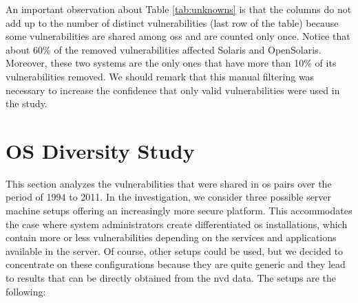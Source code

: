 An important observation about Table \ref{tab:unknowns} is that the columns do not add up to the number of distinct vulnerabilities (last row of the table) because some vulnerabilities are shared among \glspl{os} and are counted only once.
Notice that about 60\% of the removed vulnerabilities affected Solaris and OpenSolaris.
Moreover, these two systems are the only ones that have more than 10\% of its vulnerabilities removed.
We should remark that this manual filtering was necessary to increase the confidence that only valid vulnerabilities were used in the study.


\section{OS Diversity Study}\label{study}



This section analyzes the vulnerabilities that were shared in \gls{os} pairs over the period of 1994 to 2011. 
In the investigation, we consider three possible server machine setups offering an increasingly more secure platform. 
This accommodates the case where system administrators create differentiated \gls{os} installations, which contain more or less vulnerabilities depending on the services and applications available in the server. 
Of course, other setups could be used, but we decided to concentrate on these configurations because they are quite generic and they lead to results that can be directly obtained from the \gls{nvd} data. 
The setups are the following:

